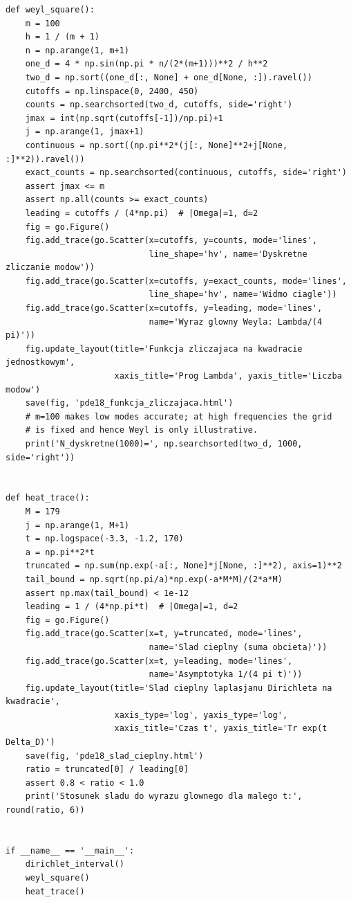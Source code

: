 \begin{lstlisting}[style=pythonpde,caption={Wartości własne, prawo Weyla i ślad cieplny (Plotly)},label={code:pde18-plotly}]
def weyl_square():
    m = 100
    h = 1 / (m + 1)
    n = np.arange(1, m+1)
    one_d = 4 * np.sin(np.pi * n/(2*(m+1)))**2 / h**2
    two_d = np.sort((one_d[:, None] + one_d[None, :]).ravel())
    cutoffs = np.linspace(0, 2400, 450)
    counts = np.searchsorted(two_d, cutoffs, side='right')
    jmax = int(np.sqrt(cutoffs[-1])/np.pi)+1
    j = np.arange(1, jmax+1)
    continuous = np.sort((np.pi**2*(j[:, None]**2+j[None, :]**2)).ravel())
    exact_counts = np.searchsorted(continuous, cutoffs, side='right')
    assert jmax <= m
    assert np.all(counts >= exact_counts)
    leading = cutoffs / (4*np.pi)  # |Omega|=1, d=2
    fig = go.Figure()
    fig.add_trace(go.Scatter(x=cutoffs, y=counts, mode='lines',
                             line_shape='hv', name='Dyskretne zliczanie modow'))
    fig.add_trace(go.Scatter(x=cutoffs, y=exact_counts, mode='lines',
                             line_shape='hv', name='Widmo ciagle'))
    fig.add_trace(go.Scatter(x=cutoffs, y=leading, mode='lines',
                             name='Wyraz glowny Weyla: Lambda/(4 pi)'))
    fig.update_layout(title='Funkcja zliczajaca na kwadracie jednostkowym',
                      xaxis_title='Prog Lambda', yaxis_title='Liczba modow')
    save(fig, 'pde18_funkcja_zliczajaca.html')
    # m=100 makes low modes accurate; at high frequencies the grid
    # is fixed and hence Weyl is only illustrative.
    print('N_dyskretne(1000)=', np.searchsorted(two_d, 1000, side='right'))


def heat_trace():
    M = 179
    j = np.arange(1, M+1)
    t = np.logspace(-3.3, -1.2, 170)
    a = np.pi**2*t
    truncated = np.sum(np.exp(-a[:, None]*j[None, :]**2), axis=1)**2
    tail_bound = np.sqrt(np.pi/a)*np.exp(-a*M*M)/(2*a*M)
    assert np.max(tail_bound) < 1e-12
    leading = 1 / (4*np.pi*t)  # |Omega|=1, d=2
    fig = go.Figure()
    fig.add_trace(go.Scatter(x=t, y=truncated, mode='lines',
                             name='Slad cieplny (suma obcieta)'))
    fig.add_trace(go.Scatter(x=t, y=leading, mode='lines',
                             name='Asymptotyka 1/(4 pi t)'))
    fig.update_layout(title='Slad cieplny laplasjanu Dirichleta na kwadracie',
                      xaxis_type='log', yaxis_type='log',
                      xaxis_title='Czas t', yaxis_title='Tr exp(t Delta_D)')
    save(fig, 'pde18_slad_cieplny.html')
    ratio = truncated[0] / leading[0]
    assert 0.8 < ratio < 1.0
    print('Stosunek sladu do wyrazu glownego dla malego t:', round(ratio, 6))


if __name__ == '__main__':
    dirichlet_interval()
    weyl_square()
    heat_trace()
\end{lstlisting}



